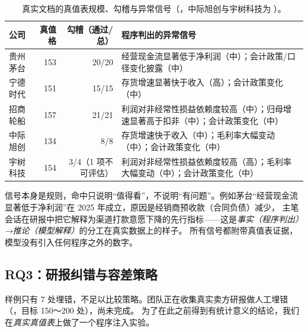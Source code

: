 \begin{table}[t]
\centering
\caption{真实文档的真值表规模、勾稽与异常信号（，中际旭创与宇树科技为 ）。}
\label{tab:exp-real-analysis}
\small
\begin{tabularx}{\linewidth}{@{}l r r X@{}}
\toprule
公司 & 真值格 & 勾稽（通过/总） & 程序判出的异常信号 \\
\midrule
贵州茅台 & 153 & 20/20 & 经营现金流显著低于净利润（中）；会计政策/口径变化披露（中） \\
宁德时代 & 151 & 15/15 & 存货增速显著快于收入（高）；会计政策变化（中） \\
招商轮船 & 157 & 21/21 & 利润对非经常性损益依赖度较高（中）；归母增速显著高于扣非（中）；会计政策变化（中） \\
中际旭创 & 134 & 8/8 & 存货增速快于收入（中）；毛利率大幅变动（中）；会计政策变化（中） \\
宇树科技 & 154 & 3/4（1 项不可评估） & 利润对非经常性损益依赖度较高（高）；毛利率大幅变动（中）；会计政策变化（中） \\
\bottomrule
\end{tabularx}
\end{table}

信号本身是规则，命中只说明“值得看”，不说明“有问题”。例如茅台“经营现金流显著低于净利润”在 2025 年成立，原因是经销商预收款（合同负债）减少，
主笔会话在研报中把它解释为渠道打款意愿下降的先行指标——这是\emph{事实（程序判出）→推论（模型解释）}的分工在真实数据上的样子。
所有信号都附带真值表证据，模型没有引入任何程序之外的数字。

\subsection{RQ3：研报纠错与容差策略}
\label{sec:exp-rq3}

样例只有 7 处埋错，不足以比较策略。团队正在收集真实卖方研报做人工埋错（，目标 150～200 处），尚未完成。
为了在此之前得到有统计意义的结论，我们在\emph{真实真值表}上做了一个程序注入实验。

